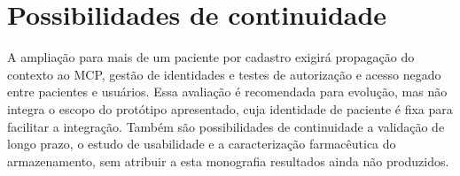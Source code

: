 \section{Possibilidades de continuidade}
A ampliação para mais de um paciente por cadastro exigirá propagação do contexto ao MCP, gestão de identidades e testes de autorização e acesso negado entre pacientes e usuários. Essa avaliação é recomendada para evolução, mas não integra o escopo do protótipo apresentado, cuja identidade de paciente é fixa para facilitar a integração. Também são possibilidades de continuidade a validação de longo prazo, o estudo de usabilidade e a caracterização farmacêutica do armazenamento, sem atribuir a esta monografia resultados ainda não produzidos.
